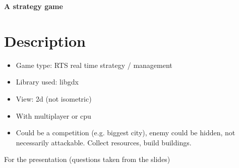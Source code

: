 \documentclass{article}
\begin{document}
  \begin{center}
    \LARGE{\textbf{A strategy game}}
  \end{center}

  \section{Description}
  \label{sec:Description}

  \begin{itemize}
    \item   Game type: RTS real time strategy / management

    \item  Library used: libgdx

    \item  View: 2d (not isometric)

    \item  With multiplayer or cpu
    \item   Could be a competition (e.g. biggest city), enemy could be hidden, not necessarily attackable.
      Collect resources, build buildings.
  \end{itemize}







  For the presentation (questions taken from the slides)
\end{document}
